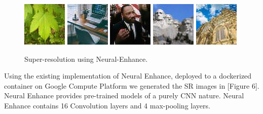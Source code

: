 \documentclass[letterpaper,12pt]{article}
\begin{document}
\begin{figure}[h!]
    \includegraphics[width=.2\textwidth]{alexjc_neural-enhance/green-maple-leaf.jpg}\hfill
    \includegraphics[width=.2\textwidth]{alexjc_neural-enhance/home-office.jpg}\hfill
    \includegraphics[width=.2\textwidth]{alexjc_neural-enhance/martin-luther-king.jpg}\hfill
    \includegraphics[width=.2\textwidth]{alexjc_neural-enhance/mount-rushmore.jpg}\hfill
    \includegraphics[width=.2\textwidth]{alexjc_neural-enhance/salisbury-cathedral.jpg}
    \caption{Super-resolution using Neural-Enhance.}
\end{figure}

Using the existing implementation of Neural Enhance\cite{AlexJC}, deployed to a dockerized container on Google Compute Platform we generated the SR images in [Figure 6]. Neural Enhance provides pre-trained models of a purely CNN nature. Neural Enhance contains 16 Convolution layers and 4 max-pooling layers.

\pagebreak
\end{document}
